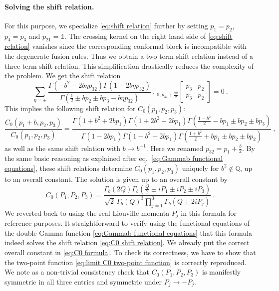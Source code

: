 \documentclass[12pt,a4paper]{article}
\newcommand{\be}{\begin{equation}}
\newcommand{\ee}{\end{equation}}
\newcommand\QQ{\mathbb{Q}}
\newcommand\id{\mathds{1}}
\begin{document}
\paragraph{Solving the shift relation.} For this purpose, we specialize \eqref{eq:shift relation} further by setting $p_1=p_2$, $p_4=p_3$ and $p_{21}=\id$. The crossing kernel on the right hand side of \eqref{eq:shift relation} vanishes since the corresponding conformal block is incompatible with the degenerate fusion rules. Thus we obtain a two term shift relation instead of a three term shift relation. This simplification drastically reduces the complexity of the problem. We get the shift relation
\be 
\sum_{\eta=\pm} \frac{ \Gamma(-b^2-2 b \eta p_{32})\Gamma(1-2 b \eta p_{32})}{\Gamma(\frac{1}{2}\pm b p_2\pm b p_3-b \eta p_{32})} \, \mathbb{F}_{\id,p_{32}+\frac{b \eta}{2}}\!\begin{bmatrix}
    p_3 & p_2 \\
    p_3 & p_2
\end{bmatrix}=0\ .
\ee
This implies the following shift relation for $C_0(p_1,p_2,p_3)$:
\be 
\frac{C_0(p_1+b,p_2,p_3)}{C_0(p_1,p_2,p_3)}=\frac{\Gamma(1+b^2+2b p_1)\Gamma(1+2b^2+2b p_1)\Gamma(\frac{1-b^2}{2}-b p_1\pm b p_2 \pm b p_3)}{\Gamma(1-2b p_1)\Gamma(1-b^2-2b p_1)\Gamma(\frac{1+b^2}{2}+b p_1 \pm bp_2 \pm b p_2)}\ , \label{eq:C0 shift relation}
\ee
as well as the same shift relation with $b \to b^{-1}$. Here we renamed $p_{32}=p_1+\frac{b}{2}$. By the same basic reasoning as explained after eq.~\eqref{eq:Gammab functional equations}, these shift relations determine $C_0(p_1,p_2,p_3)$ uniquely for $b^2 \not\in \QQ$, up to an overall constant. 
The solution is given up to an overall constant by
\be 
C_0(P_1,P_2,P_3)= \frac{\Gamma_b(2Q)\Gamma_b(\frac{Q}{2} \pm i P_1\pm i P_2 \pm i P_3)}{\sqrt{2}\,\Gamma_b(Q)^3\prod_{j=1}^3\Gamma_b(Q\pm 2i P_j)}\ . \label{eq:C0 formula}
\ee
We reverted back to using the real Liouville momenta $P_j$ in this formula for reference purposes.
It straightforward to verify using the functional equations of the double Gamma function \eqref{eq:Gammab functional equations} that this formula indeed solves the shift relation \eqref{eq:C0 shift relation}. We already put the correct overall constant in \eqref{eq:C0 formula}. To check its correctness, we have to show that the two-point function \eqref{eq:limit C0 two-point function} is correctly reproduced. We note as a non-trivial consistency check that $C_0(P_1,P_2,P_3)$ is manifestly symmetric in all three entries and symmetric under $P_j \to -P_j$. 
\end{document}

